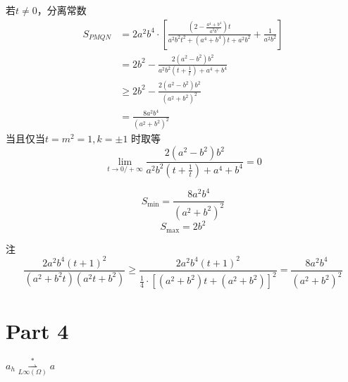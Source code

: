 \documentclass[UTF8]{article}
\begin{document}
若$t \ne   0$，分离常数
$$
\begin{aligned}
 {S_{PMQN}}& = 2{a^2}{b^4} \cdot \left[ {\frac{{\left( {2 - \frac{{{a^4} + {b^4}}}{{{a^2}{b^2}}}} \right)t}}{{{a^2}{b^2}{t^2} + ({a^4} + {b^4})t + {a^2}{b^2}}} + \frac{1}{{{a^2}{b^2}}}} \right]
 \\&=2{b^2} - \frac{{2({a^2} - {b^2}){b^2}}}{{{a^2}{b^2}\left( {t + \frac{1}{t}} \right) + {a^4} + {b^4}}}
 \\&\ge 2{b^2} - \frac{{2({a^2} - {b^2}){b^2}}}{{{{({a^2} + {b^2})}^2}}}
 \\&=\frac{{8{a^2}{b^4}}}{{{{({a^2} + {b^2})}^2}}}
\end{aligned}
$$
当且仅当$t=m^2=1,k=\pm 1$ 时取等
$$
\lim_{t \to 0/+\infty} \frac{{2({a^2} - {b^2}){b^2}}}{{{a^2}{b^2}\left( {t + \frac{1}{t}} \right) + {a^4} + {b^4}}}=0
$$

$$
  {S_{{\text{min}}}}=\frac{{8{a^2}{b^4}}}{{{{({a^2} + {b^2})}^2}}}
  $$
$$
  {S_{{\text{max}}}}  = 2{b^2}
$$

注
$$
\frac{{2{a^2}{b^4}{{({t} + 1)}^2}}}{{({a^2} + {b^2}{t})({a^2}{t} + {b^2})}}\ge\frac{{2{a^2}{b^4}{{(t + 1)}^2}}}{{\frac{1}{4} \cdot {{[({a^2} + {b^2})t + ({a^2} + {b^2})]}^2}}}=\frac{{8{a^2}{b^4}}}{{{{({a^2} + {b^2})}^2}}}
$$
\section{Part 4}

$a_h \overset{*}{\underset{L \infty (\Omega)}{\rightharpoonup}} a$



\end{document}
